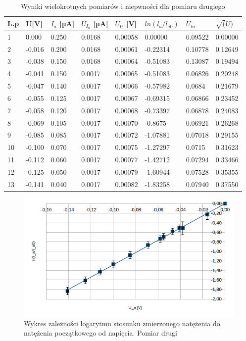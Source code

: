 \documentclass[a4paper]{article}
\begin{document}
\begin{table}[h!]
\centering
 \begin{tabular}{ | l | l | l | l | l | l | l | l | }
 \hline
L.p & U[V] & $I_{a}$ [µA] & $U_{I_{a}}$ [µA] & $U_{U}$ [V] & $ln(l_{a}/l_{a0})$ & $U_{ln}$ & $\sqrt(U)$ \\ \hline
1 & 0.000 & 0.250 & 0.0168 & 0.00058 & 0.00000 & 0.09522 & 0.00000 \\ \hline
2 & -0.016 & 0.200 & 0.0168 & 0.00061 & -0.22314 & 0.10778 & 0.12649 \\ \hline
3 & -0.038 & 0.150 & 0.0168 & 0.00064 & -0.51083 & 0.13087 & 0.19494 \\ \hline
4 & -0.041 & 0.150 & 0.0017 & 0.00065 & -0.51083 & 0.06826 & 0.20248 \\ \hline
5 & -0.047 & 0.140 & 0.0017 & 0.00066 & -0.57982 & 0.0684 & 0.21679 \\ \hline
6 & -0.055 & 0.125 & 0.0017 & 0.00067 & -0.69315 & 0.06866 & 0.23452 \\ \hline
7 & -0.058 & 0.120 & 0.0017 & 0.00068 & -0.73397 & 0.06878 & 0.24083 \\ \hline
8 & -0.069 & 0.105 & 0.0017 & 0.00070 & -0.8675 & 0.06921 & 0.26268 \\ \hline
9 & -0.085 & 0.085 & 0.0017 & 0.00072 & -1.07881 & 0.07018 & 0.29155 \\ \hline
10 & -0.100 & 0.070 & 0.0017 & 0.00075 & -1.27297 & 0.0715 & 0.31623 \\ \hline
11 & -0.112 & 0.060 & 0.0017 & 0.00077 & -1.42712 & 0.07294 & 0.33466 \\ \hline
12 & -0.125 & 0.050 & 0.0017 & 0.00079 & -1.60944 & 0.07528 & 0.35355 \\ \hline
13 & -0.141 & 0.040 & 0.0017 & 0.00082 & -1.83258 & 0.07940 & 0.37550 \\ \hline
 \end{tabular}
\caption{Wyniki wielokrotnych pomiarów i niepwności dla pomiaru drugiego}
\end{table}

\begin{figure}[h!]
	\includegraphics[scale=1]{T2_ln_U}
	\centering
	\caption{Wykres zależności logarytmu stosunku zmierzonego natężenia do natężenia początkowego od napięcia. Pomiar drugi}
\end{figure}
\end{document}
